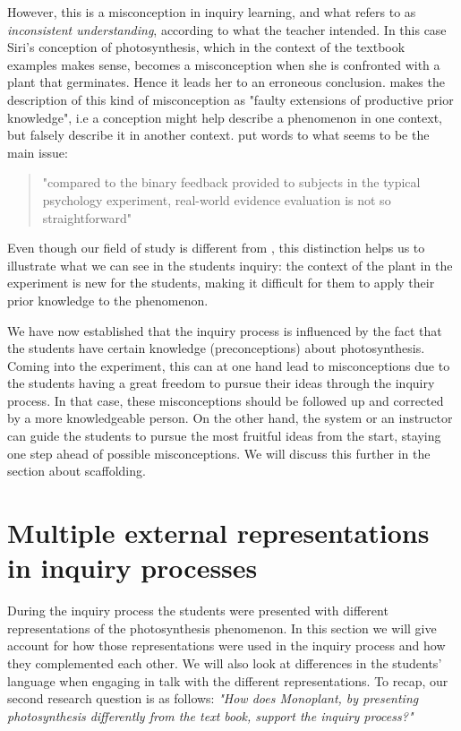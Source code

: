 However, this is a misconception in inquiry learning, and what \citet{gomez2008elementary} refers to as \emph{inconsistent understanding}, according to what the teacher intended. In this case Siri's conception of photosynthesis, which in the context of the textbook examples makes sense, becomes a misconception when she is confronted with a plant that germinates. Hence it leads her to an erroneous conclusion. \citet{smith1994misconceptions} makes the description of this kind of misconception as "faulty extensions of productive prior knowledge", i.e a conception might help describe a phenomenon in one context, but falsely describe it in another context. \citeauthor*{klahr1993heuristics} put words to what seems to be the main issue: 

\begin{quote}"compared to the binary feedback provided to subjects in the typical psychology experiment, real-world evidence evaluation is not so straightforward" \citetext{\citet[p. 114]{klahr1993heuristics}, referenced in \citealp{de1998scientific}}
\end{quote}

Even though our field of study is different from \citeauthor{klahr1993heuristics}, this distinction helps us to illustrate what we can see in the students inquiry: the context of the plant in the experiment is new for the students, making it difficult for them to apply their prior knowledge to the phenomenon.  

We have now established that the inquiry process is influenced by the fact that the students have certain knowledge (preconceptions) about photosynthesis. Coming into the experiment, this can at one hand lead to misconceptions due to the students having a great freedom to pursue their ideas through the inquiry process. In that case, these misconceptions should be followed up and corrected by a more knowledgeable person. On the other hand, the system or an instructor can guide the students to pursue the most fruitful ideas from the start, staying one step ahead of possible misconceptions. We will discuss this further in the section about scaffolding.



\section{Multiple external representations in inquiry processes}
During the inquiry process the students were presented with different representations of the photosynthesis phenomenon. In this section we will give account for how those representations were used in the inquiry process and how they complemented each other. We will also look at differences in the students' language when engaging in talk with the different representations. To recap, our second research question is as follows: \emph{"How does Monoplant, by presenting photosynthesis differently from the text book, support the inquiry process?"}

